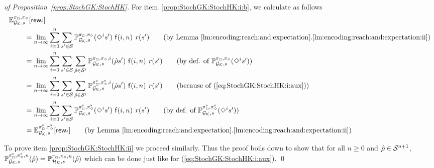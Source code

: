 \begin{proof}[of Proposition~\ref{prop:StochGK:StochHK}]
  For item~\ref{prop:StochGK:StochHK:i:b}, we calculate as follows
  \begin{align*}
    \Expect^{\strat_{\maxplay},\strat_{\minplay}}_{\StochGK,s}[\GRewards]
    \hspace{-3em} &
    \\
    & =    
    \lim_{n\to\infty} \sum^{n}_{i=0}\sum_{s' \in \sgnodes} \Prob^{\strat_{\maxplay},\strat_{\minplay}}_{\StochGK,s}(\Finally^i s')\mult\fgen(i,n)\mult\reward(s')
    \tag{by Lemma~\ref{lm:encoding:reach:and:expectation}.\ref{lm:encoding:reach:and:expectation:ii}}\\
    & =    
    \lim_{n\to\infty} \sum^{n}_{i=0}\sum_{s' \in \sgnodes}\sum_{\hat{\rho} \in \sgnodes^i} \Prob^{\strat_{\maxplay},\strat_{\minplay},i}_{\StochGK,s}(\hat{\rho}s')\mult\fgen(i,n)\mult\reward(s')
    \tag{by def. of $\Prob^{\strat_{\maxplay},\strat_{\minplay}}_{\StochGK,s}(\Finally^i s')$}\\
    & =    
    \lim_{n\to\infty} \sum^{n}_{i=0}\sum_{s' \in \sgnodes}\sum_{\hat{\rho} \in \sgnodes^i} \Prob^{\stratv_{\maxplay},\stratv_{\minplay},i}_{\StochGK,s}(\hat{\rho}s')\mult\fgen(i,n)\mult\reward(s')
    \tag{because of (\ref{eq:StochGK:StochHK:i:aux})}\\
    & =
    \lim_{n\to\infty} \sum^{n}_{i=0}\sum_{s' \in \sgnodes} \Prob^{\stratv_{\maxplay},\stratv_{\minplay}}_{\StochGK,s}(\Finally^i s')\mult\fgen(i,n)\mult\reward(s')
    \tag{by def. of $\Prob^{\stratv_{\maxplay},\stratv_{\minplay}}_{\StochGK,s}(\Finally^i s')$}\\
    & =
    \Expect^{\stratv_{\maxplay},\stratv_{\minplay}}_{\StochGK,s}[\GRewards]
    \tag{by Lemma~\ref{lm:encoding:reach:and:expectation}.\ref{lm:encoding:reach:and:expectation:ii}}
  \end{align*}

  To prove item \ref{prop:StochGK:StochHK:ii} we proceed similarly.
  Thus the proof boils down to show that for all $n\geq0$ and
  $\hat{\rho}\in\mathcal{S}^{n+1}$,
  $\mathbb{P}^{{\pi}^{\mathsf{x}}_{{\Box}},{\pi}^{\mathsf{x}}_{{\Diamond}},n}_{{\mathcal{G}_{\mathcal{K}}},s}(\hat{\rho})
  =
  \mathbb{P}^{\pi_{{\Box}},\pi_{{\Diamond}},n}_{{\mathcal{H}_{\mathcal{K}}},s}(\hat{\rho})$
  which can be done just like for (\ref{eq:StochGK:StochHK:i:aux}).
  \qed
\end{proof}

